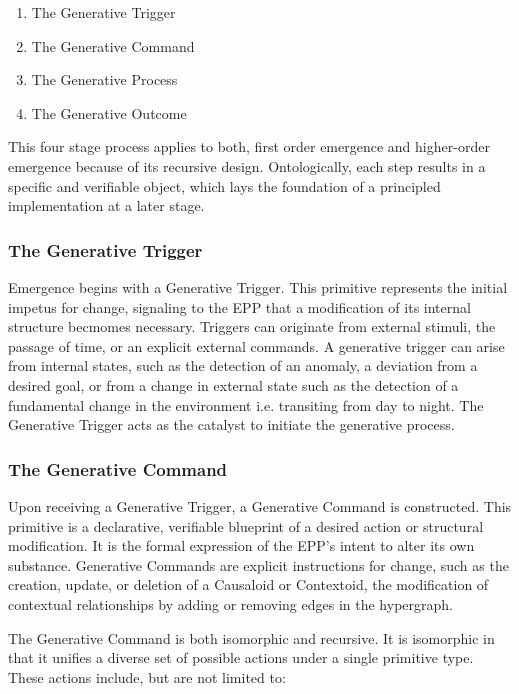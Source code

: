 \begin{enumerate}
	\item The Generative Trigger
	\item The Generative Command
	\item The Generative Process
	\item The Generative Outcome 
\end{enumerate}

This four stage process applies to both, first order emergence and higher-order emergence because of its recursive design. Ontologically, each step results in a specific and verifiable object, which lays the foundation of a principled implementation at a later stage. 


\subsubsection{The Generative Trigger}
\label{sec:ontology_emgerence_gen_trigger}

Emergence begins with a Generative Trigger. This primitive represents the initial impetus for change, signaling to the EPP that a modification of its internal structure becmomes necessary. Triggers can originate from external stimuli, the passage of time, or an explicit external commands. A generative trigger can arise from internal states, such as the detection of an anomaly, a deviation from a desired goal, or from a change in external state such as the detection of a fundamental change in the environment i.e. transiting from day to night. The Generative Trigger acts as the catalyst to initiate the generative process.


\subsubsection{The Generative Command}
\label{sec:ontology_emgerence_gen_command}

Upon receiving a Generative Trigger, a Generative Command is constructed. This primitive is a declarative, verifiable blueprint of a desired action or structural modification. It is the formal expression of the EPP's intent to alter its own substance. Generative Commands are explicit instructions for change, such as the creation, update, or deletion of a Causaloid or Contextoid, the modification of contextual relationships by adding or removing edges in the hypergraph. 

The Generative Command is both isomorphic and recursive. It is isomorphic in that it unifies a diverse set of possible actions under a single primitive type. These actions include, but are not limited to:

